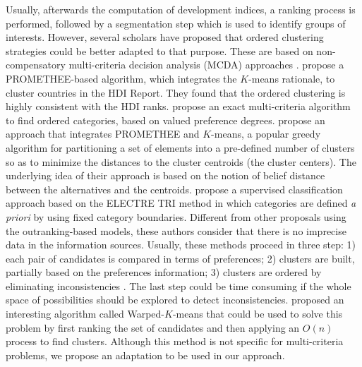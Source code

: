 \documentclass[]{elsarticle}
\theoremstyle{definition}
\begin{document}
Usually, afterwards the computation of development indices, a ranking process is performed, followed by a segmentation step which is used to identify groups of interests.  However, several scholars have proposed that ordered clustering strategies could be better adapted to that purpose. These are based on non-compensatory multi-criteria decision analysis (MCDA) approaches  \citep{DeSmet2014}.    \cite{Chen2018} propose a PROMETHEE-based algorithm, which  integrates the $K$-means rationale, to cluster countries in the HDI Report. They found that the ordered clustering is highly consistent with the HDI ranks. \cite{DeSmet2012} propose an exact multi-criteria algorithm to find ordered categories, based on valued preference degrees.   \cite{Boujelben2016} propose an approach that integrates PROMETHEE and $K$-means, a popular greedy algorithm for partitioning a set of elements into a pre-defined number of clusters so as to minimize the distances to the cluster centroids (the cluster centers). The underlying idea of their approach is based on the notion of belief distance between the alternatives and the centroids. \cite{Monteiro2018} propose a supervised classification approach based on the ELECTRE TRI method in which categories are defined \emph{a priori} by using fixed category boundaries. Different from other proposals using the outranking-based models, these authors consider that there is no imprecise data in the information sources. Usually, these methods proceed in three step:  1) each pair of candidates is compared in terms of preferences; 2) clusters are built, partially based on the preferences information; 3) clusters are ordered by eliminating inconsistencies \citep{Fernandez2010}. The last step could be time consuming if the whole space of possibilities should  be explored to detect inconsistencies.  \cite{Leiva2013} proposed an interesting algorithm called Warped-$K$-means that could be used to solve this problem by first ranking the set of candidates and then applying an $O(n)$ process to find clusters. Although this method is not specific for multi-criteria problems, we propose an adaptation to be used in our approach.
\end{document}

